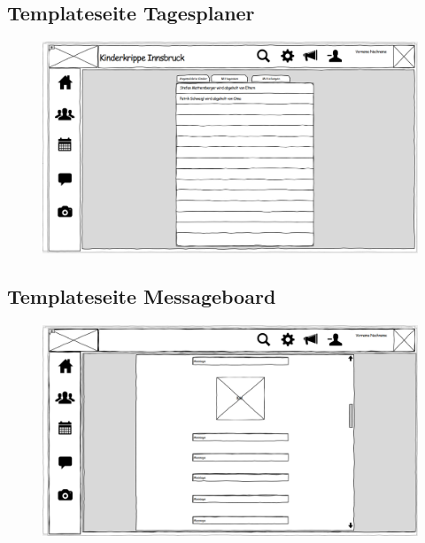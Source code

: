   \subsection{Templateseite Tagesplaner}
 \begin{figure}[ht!]
  \includegraphics[width = 150mm]{pictures/Tagesplaner.PNG}
 \end{figure}
 
  \newpage
 \subsection{Templateseite Messageboard}
 \begin{figure}[ht!]
  \includegraphics[width = 150mm]{pictures/Messageboard.PNG}
 \end{figure}
 
